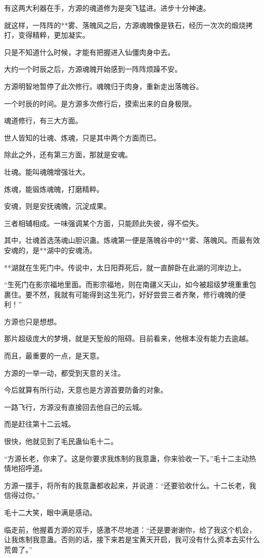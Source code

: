 \begin{this_body}
有这两大利器在手，方源的魂道修为是突飞猛进。进步十分神速。

就这样，一阵阵的**雾、落魄风之后，方源魂魄像是铁石，经历一次次的煅烧拷打，变得精粹，更加凝实。

只是不知道什么时候，才能有把握进入仙僵肉身中去。

大约一个时辰之后，方源魂魄开始感到一阵阵烦躁不安。

方源明智地暂停了此次修行。魂魄归于肉身，重新走出落魄谷。

一个时辰的时间。是方源多次修行后，摸索出来的自身极限。

魂道修行，有三大方面。

世人皆知的壮魂、炼魂，只是其中两个方面而已。

除此之外，还有第三方面，那就是安魂。

壮魂。能叫魂魄增强壮大。

炼魂，能锻炼魂魄，打磨精粹。

安魂，则是安抚魂魄，沉淀成果。

三者相辅相成。一味强调某个方面，只能顾此失彼，得不偿失。

其中，壮魂首选荡魂山胆识蛊。炼魂第一便是落魄谷中的**雾、落魄风。而最有效安魂的，是**湖中的安魂汤。

**湖就在生死门中。传说中，太日阳莽死后，就一直醉卧在此湖的河岸边上。

“生死门在影宗福地里面。而影宗福地，则在南疆义天山，如今被超级梦境重重包裹住。要不然，我就有可能得到这生死门，好好尝尝三者齐聚，修行魂魄的便利！”

方源也只是想想。

那片超级庞大的梦境，就是天堑般的阻碍。目前看来，他根本没有能力去逾越。

而且，最重要的一点，是天意。

方源的一举一动，都受到天意的关注。

今后就算有所行动，天意也是方源首要防备的对象。

一路飞行，方源没有直接回去他自己的云城。

而是赶往第十二云城。

很快，他就见到了毛民蛊仙毛十二。

“方源长老，你来了。这是你要求我炼制的我意蛊，你来验收一下。”毛十二主动热情地招呼道。

方源一摆手，将所有的我意蛊都收起来，并说道：“还要验收什么。十二长老，我信得过你。”

毛十二大笑，眼中满是感动。

临走前，他握着方源的双手，感激不尽地道：“还是要谢谢你，给了我这个机会，让我炼制我意蛊。否则的话，接下来若是宝黄天开启，我可没有什么资本去买什么荒兽了。”


\end{this_body}
